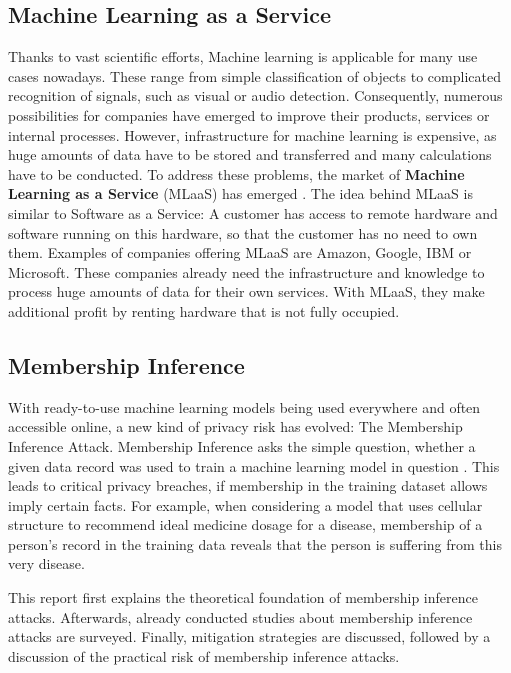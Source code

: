 \documentclass[runningheads]{llncs}
\begin{document}
\subsection{Machine Learning as a Service}

Thanks to vast scientific efforts, Machine learning is applicable for many use cases nowadays. These range from simple classification of objects to complicated recognition of signals, such as visual or audio detection. Consequently, numerous possibilities for companies have emerged to improve their products, services or internal processes. However, infrastructure for machine learning is expensive, as huge amounts of data have to be stored and transferred and many calculations have to be conducted. To address these problems, the market of \textbf{Machine Learning as a Service} (MLaaS) has emerged \cite{ribeiro2015mlaas}. The idea behind MLaaS is similar to Software as a Service: A customer has access to remote hardware and software running on this hardware, so that the customer has no need to own them. Examples of companies offering MLaaS are Amazon, Google, IBM or Microsoft. These companies already need the infrastructure and knowledge to process huge amounts of data for their own services. With MLaaS, they make additional profit by renting hardware that is not fully occupied.

\subsection{Membership Inference}

With ready-to-use machine learning models being used everywhere and often accessible online, a new kind of privacy risk has evolved: The Membership Inference Attack. Membership Inference asks the simple question, whether a given data record was used to train a machine learning model in question \cite{shokri2017membership}. This leads to critical privacy breaches, if membership in the training dataset allows imply certain facts. For example, when considering a model that uses cellular structure to recommend ideal medicine dosage for a disease, membership of a person's record in the training data reveals that the person is suffering from this very disease.

This report first explains the theoretical foundation of membership inference attacks. Afterwards, already conducted studies about membership inference attacks are surveyed. Finally, mitigation strategies are discussed, followed by a discussion of the practical risk of membership inference attacks.
\end{document}
